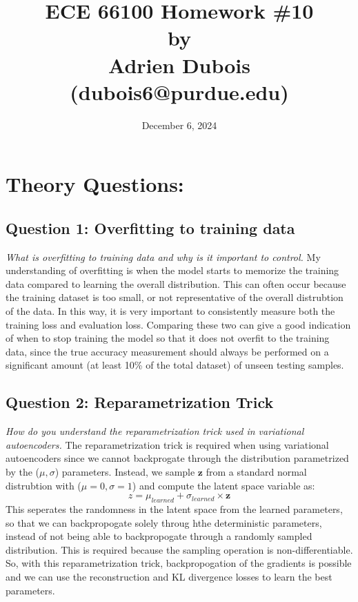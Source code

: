 \documentclass{article}
\author{}
\date{December 6, 2024}
\title{\Large \textbf{ECE 66100 Homework \#10\\[0.1in] by\\ [0.1in] Adrien Dubois (dubois6@purdue.edu)}}
\begin{document}
\maketitle
\tableofcontents

\section{Theory Questions:}
\subsection{Question 1: Overfitting to training data}
\textit{What is overfitting to training data and why is it important to control.}
My understanding of overfitting is when the model starts to memorize the training data compared to learning the overall distribution. This can often occur because the training dataset is too small, or not representative of the overall distrubtion of the data. In this way, it is very important to consistently measure both the training loss and evaluation loss. Comparing these two can give a good indication of when to stop training the model so that it does not overfit to the training data, since the true accuracy measurement should always be performed on a significant amount (at least 10\% of the total dataset) of unseen testing samples.

\subsection{Question 2: Reparametrization Trick}
\textit{How do you understand the reparametrization trick used in variational autoencoders.}
The reparametrization trick is required when using variational autoencoders since we cannot backprogate through the distribution parametrized by the ($\mu, \sigma$) parameters. Instead, we sample $\boldsymbol{z}$ from a standard normal distrubtion with ($\mu = 0, \sigma = 1$) and compute the latent space variable as:
\[z = \mu_{learned} + \sigma_{learned} \times \boldsymbol{z}\]
This seperates the randomness in the latent space from the learned parameters, so that we can backpropogate solely throug hthe deterministic parameters, instead of not being able to backpropogate through a randomly sampled distribution. This is required because the sampling operation is non-differentiable. So, with this reparametrization trick, backpropogation of the gradients is possible and we can use the reconstruction and KL divergence losses to learn the best parameters.
\end{document}
